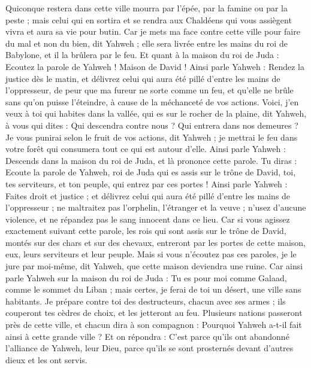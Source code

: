 \begin{multicols}{2}
Quiconque restera dans cette ville mourra par l'épée, par la famine ou par la peste ; mais celui qui en sortira et se rendra aux Chaldéens qui vous assiègent vivra et aura sa vie pour butin.
Car je mets ma face contre cette ville pour faire du mal et non du bien, dit Yahweh ; elle sera livrée entre les mains du roi de Babylone, et il la brûlera par le feu.
Et quant à la maison du roi de Juda : Ecoutez la parole de Yahweh !
Maison de David ! Ainsi parle Yahweh : Rendez la justice dès le matin, et délivrez celui qui aura été pillé d'entre les mains de l'oppresseur, de peur que ma fureur ne sorte comme un feu, et qu'elle ne brûle sans qu'on puisse l'éteindre, à cause de la méchanceté de vos actions.
Voici, j'en veux à toi qui habites dans la vallée, qui es sur le rocher de la plaine, dit Yahweh, à vous qui dites : Qui descendra contre nous ? Qui entrera dans nos demeures ?
Je vous punirai selon le fruit de vos actions, dit Yahweh ; je mettrai le feu dans votre forêt qui consumera tout ce qui est autour d'elle.
\VerseOne{}Ainsi parle Yahweh : Descends dans la maison du roi de Juda, et là prononce cette parole.
Tu diras : Ecoute la parole de Yahweh, roi de Juda qui es assis sur le trône de David, toi, tes serviteurs, et ton peuple, qui entrez par ces portes !
Ainsi parle Yahweh : Faites droit et justice ; et délivrez celui qui aura été pillé d'entre les mains de l'oppresseur ; ne maltraitez pas l'orphelin, l'étranger et la veuve ; n'usez d'aucune violence, et ne répandez pas le sang innocent dans ce lieu.
Car si vous agissez exactement suivant cette parole, les rois qui sont assis sur le trône de David, montés sur des chars et sur des chevaux, entreront par les portes de cette maison, eux, leurs serviteurs et leur peuple.
Mais si vous n'écoutez pas ces paroles, je le jure par moi-même, dit Yahweh, que cette maison deviendra une ruine.
Car ainsi parle Yahweh sur la maison du roi de Juda : Tu es pour moi comme Galaad, comme le sommet du Liban ; mais certes, je ferai de toi un désert, une ville sans habitants.
Je prépare contre toi des destructeurs, chacun avec ses armes ; ils couperont tes cèdres de choix, et les jetteront au feu.
Plusieurs nations passeront près de cette ville, et chacun dira à son compagnon : Pourquoi Yahweh a-t-il fait ainsi à cette grande ville ?
Et on répondra : C'est parce qu'ils ont abandonné l'alliance de Yahweh, leur Dieu, parce qu'ils se sont prosternés devant d'autres dieux et les ont servis.

\end{multicols}
